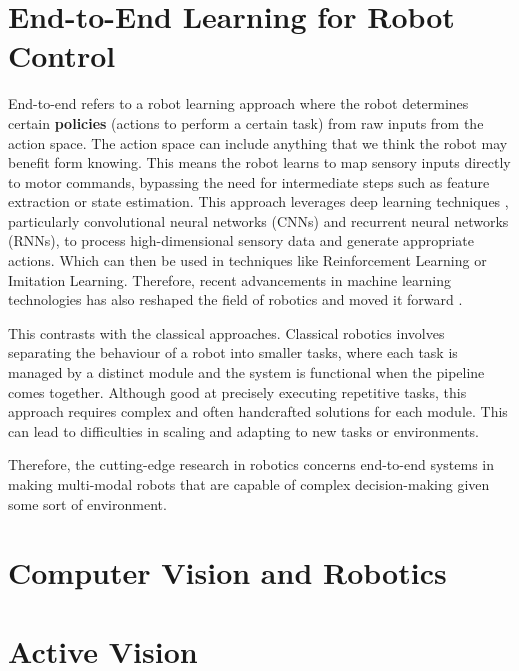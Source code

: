 \section{End-to-End Learning for Robot Control}

  End-to-end refers to a robot learning approach where the robot determines certain \textbf{policies} (actions to perform a certain task) from raw inputs from the action space. The action space can include anything that we think the robot may benefit form knowing. This means the 
  robot learns to map sensory inputs directly to motor commands, bypassing the need for intermediate steps such as feature extraction or state estimation. This approach leverages deep learning techniques \cite{Schmidhuber2015nn}, particularly convolutional neural networks (CNNs) and recurrent neural networks (RNNs), to process high-dimensional sensory data and generate appropriate actions. Which can then be used in techniques like Reinforcement Learning  or Imitation Learning.  Therefore, recent advancements in machine learning technologies has also reshaped the field of robotics and moved it forward \cite{Pierson18082017,newbury2023graspSynthReview,liu2021DRLminireview}.


  This contrasts with the classical approaches. Classical robotics involves separating the behaviour of a robot into smaller tasks, where each task is managed by a distinct module and the system is functional when the pipeline comes together. Although good at precisely executing repetitive tasks, this approach requires complex and often handcrafted solutions for each module. This can lead to difficulties in scaling and adapting to new tasks or environments. 
  
  Therefore, the cutting-edge research in robotics concerns end-to-end systems in making multi-modal robots  that are capable of complex decision-making given some sort of environment.





\section{Computer Vision and Robotics}
\section{Active Vision}